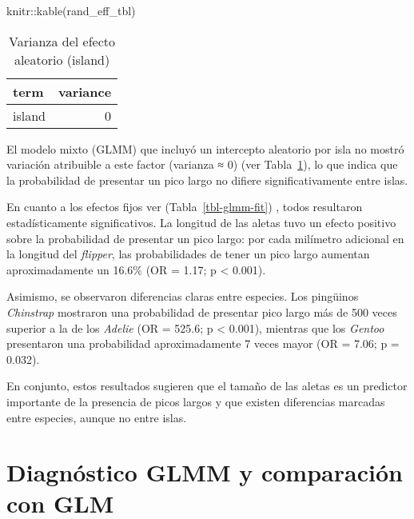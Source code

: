 \documentclass[
  spanish,
  11pt,
  a4paper,
  DIV=11,
  numbers=noendperiod]{scrartcl}
\newenvironment{Shaded}{\begin{snugshade}}{\end{snugshade}}
\newcommand{\FunctionTok}[1]{\textcolor[rgb]{0.28,0.35,0.67}{#1}}
\newcommand{\NormalTok}[1]{\textcolor[rgb]{0.00,0.23,0.31}{#1}}
\newcommand{\SpecialCharTok}[1]{\textcolor[rgb]{0.37,0.37,0.37}{#1}}
\begin{document}
\begin{Shaded}
\begin{Highlighting}[numbers=left,,]
\NormalTok{knitr}\SpecialCharTok{::}\FunctionTok{kable}\NormalTok{(rand\_eff\_tbl)}
\end{Highlighting}
\end{Shaded}

\begin{longtable}[]{@{}lr@{}}

\caption{\label{tbl-glmm-var-fit}Varianza del efecto aleatorio (island)}

\tabularnewline

\toprule\noalign{}
term & variance \\
\midrule\noalign{}
\endhead
\bottomrule\noalign{}
\endlastfoot
island & 0 \\

\end{longtable}

El modelo mixto (GLMM) que incluyó un intercepto aleatorio por isla no
mostró variación atribuible a este factor (varianza ≈ 0) (ver
Tabla~\ref{tbl-glmm-var-fit}), lo que indica que la probabilidad de
presentar un pico largo no difiere significativamente entre islas.

En cuanto a los efectos fijos ver (Tabla~\ref{tbl-glmm-fit}) , todos
resultaron estadísticamente significativos. La longitud de las aletas
tuvo un efecto positivo sobre la probabilidad de presentar un pico
largo: por cada milímetro adicional en la longitud del \emph{flipper},
las probabilidades de tener un pico largo aumentan aproximadamente un
16.6\% (OR = 1.17; p \textless{} 0.001).

Asimismo, se observaron diferencias claras entre especies. Los pingüinos
\emph{Chinstrap} mostraron una probabilidad de presentar pico largo más
de 500 veces superior a la de los \emph{Adelie} (OR = 525.6; p
\textless{} 0.001), mientras que los \emph{Gentoo} presentaron una
probabilidad aproximadamente 7 veces mayor (OR = 7.06; p = 0.032).

En conjunto, estos resultados sugieren que el tamaño de las aletas es un
predictor importante de la presencia de picos largos y que existen
diferencias marcadas entre especies, aunque no entre islas.

\section{Diagnóstico GLMM y comparación con
GLM}\label{diagnuxf3stico-glmm-y-comparaciuxf3n-con-glm}
\end{document}
